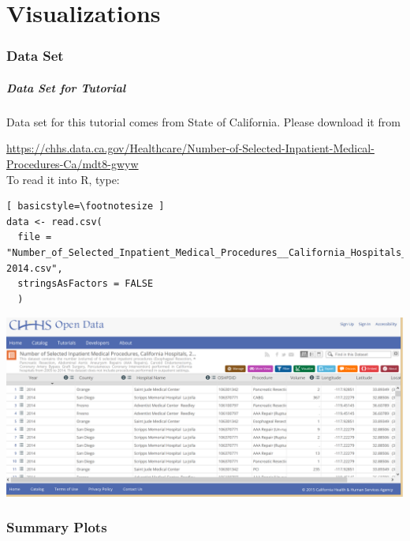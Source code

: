 \part{Visualizations}

\section{Data Set}
\begin{frame}
\frametitle{Data Set for Tutorial}
	Data set for this tutorial comes from State of California.  Please download it from \\
	\vspace{5pt}

	\noindent \url{https://chhs.data.ca.gov/Healthcare/Number-of-Selected-Inpatient-Medical-Procedures-Ca/mdt8-gwyw}  \\

	\vspace{5pt}
	\noindent To read it into R, type:
  		\begin{lstlisting}[ basicstyle=\footnotesize ]
data <- read.csv(
  file = "Number_of_Selected_Inpatient_Medical_Procedures__California_Hospitals__2005-2014.csv",
  stringsAsFactors = FALSE
  )
		\end{lstlisting}
\newpage
    \begin{center}
     \includegraphics[width=1\textwidth]{images/data.png}
    \end{center}	
\end{frame}


\section[Summary Plots]{Summary Plots}


